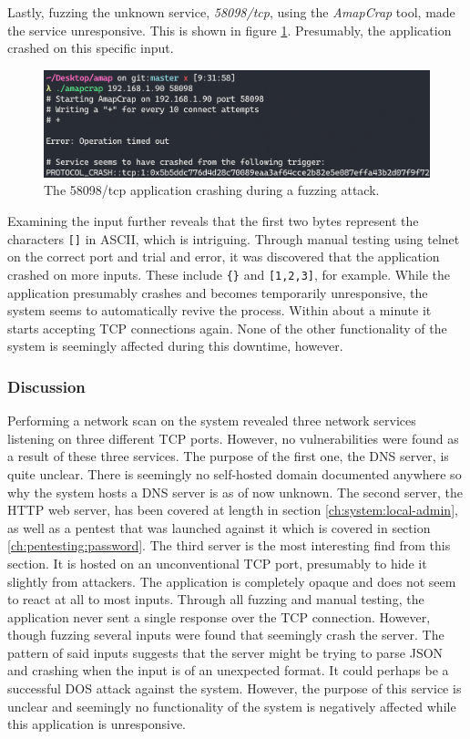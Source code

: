 Lastly, fuzzing the unknown service, \textit{58098/tcp}, using the \textit{AmapCrap} tool, made the service unresponsive. This is shown in figure \ref{fig:amapcrap-fuzz-attack}. Presumably, the application crashed on this specific input.
\begin{figure}[!ht]
    \centering
    \includegraphics[width=\textwidth]{images/6-pentesting/amapcrap-fuzz-crash.png}
    \caption{The 58098/tcp application crashing during a fuzzing attack.}
    \label{fig:amapcrap-fuzz-attack}
\end{figure}

Examining the input further reveals that the first two bytes represent the characters \texttt{[]} in ASCII, which is intriguing. Through manual testing using telnet on the correct port and trial and error, it was discovered that the application crashed on more inputs. These include \texttt{\{\}} and \texttt{[1,2,3]}, for example. While the application presumably crashes and becomes temporarily unresponsive, the system seems to automatically revive the process. Within about a minute it starts accepting TCP connections again. None of the other functionality of the system is seemingly affected during this downtime, however.

\subsubsection{Discussion}
Performing a network scan on the system revealed three network services listening on three different TCP ports. However, no vulnerabilities were found as a result of these three services. The purpose of the first one, the DNS server, is quite unclear. There is seemingly no self-hosted domain documented anywhere so why the system hosts a DNS server is as of now unknown. The second server, the HTTP web server, has been covered at length in section \ref{ch:system:local-admin}, as well as a pentest that was launched against it which is covered in section \ref{ch:pentesting:password}. The third server is the most interesting find from this section. It is hosted on an unconventional TCP port, presumably to hide it slightly from attackers. The application is completely opaque and does not seem to react at all to most inputs. Through all fuzzing and manual testing, the application never sent a single response over the TCP connection. However, though fuzzing several inputs were found that seemingly crash the server. The pattern of said inputs suggests that the server might be trying to parse JSON and crashing when the input is of an unexpected format. It could perhaps be a successful \gls{DOS} attack against the system. However, the purpose of this service is unclear and seemingly no functionality of the system is negatively affected while this application is unresponsive.

